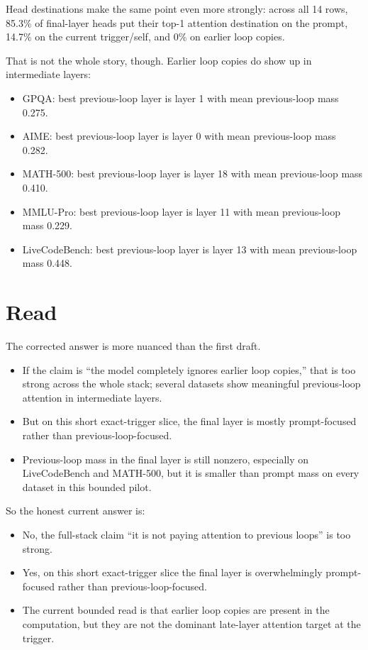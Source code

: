 \documentclass[11pt]{article}
\begin{document}
\noindent Head destinations make the same point even more strongly: across all 14 rows, 85.3\% of final-layer heads put their top-1 attention destination on the prompt, 14.7\% on the current trigger/self, and 0\% on earlier loop copies.

\medskip

That is not the whole story, though. Earlier loop copies do show up in intermediate layers:

\begin{itemize}
  \item GPQA: best previous-loop layer is layer 1 with mean previous-loop mass 0.275.
  \item AIME: best previous-loop layer is layer 0 with mean previous-loop mass 0.282.
  \item MATH-500: best previous-loop layer is layer 18 with mean previous-loop mass 0.410.
  \item MMLU-Pro: best previous-loop layer is layer 11 with mean previous-loop mass 0.229.
  \item LiveCodeBench: best previous-loop layer is layer 13 with mean previous-loop mass 0.448.
\end{itemize}

\section*{Read}

The corrected answer is more nuanced than the first draft.

\begin{itemize}
  \item If the claim is ``the model completely ignores earlier loop copies,'' that is too strong across the whole stack; several datasets show meaningful previous-loop attention in intermediate layers.
  \item But on this short exact-trigger slice, the final layer is mostly prompt-focused rather than previous-loop-focused.
  \item Previous-loop mass in the final layer is still nonzero, especially on LiveCodeBench and MATH-500, but it is smaller than prompt mass on every dataset in this bounded pilot.
\end{itemize}

So the honest current answer is:

\begin{itemize}
  \item No, the full-stack claim ``it is not paying attention to previous loops'' is too strong.
  \item Yes, on this short exact-trigger slice the final layer is overwhelmingly prompt-focused rather than previous-loop-focused.
  \item The current bounded read is that earlier loop copies are present in the computation, but they are not the dominant late-layer attention target at the trigger.
\end{itemize}
\end{document}
